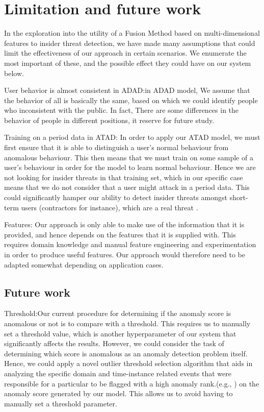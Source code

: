 \documentclass[conference]{IEEEtran}
\begin{document}
\iffalse
\section{Limitation and future work}

In the exploration into the utility of a Fusion Method based on multi-dimensional features to insider threat detection, we have made many assumptions that could limit the effectiveness of our approach in certain scenarios. We enumerate the most important of these, and the possible effect they could have on our system below.

User behavior is almost consistent in ADAD:in ADAD model, We assume that the behavior of all is basically the same, based on which we could identify people who inconsistent with the public. In fact, There are some differences in the behavior of people in different positions, it reserve for future study.

Training on a period data in ATAD: 
In order to apply our ATAD model, we must first ensure that it is able to distinguish a user’s normal behaviour from anomalous behaviour. This then means that we must train on some sample of a user’s behaviour in order for the model to learn normal behaviour. Hence we are not looking for insider threats in that training set, which in our specific case means that we do not consider that a user might attack in a period data. This could significantly hamper our ability to detect insider threats amongst short-term users (contractors for instance), which are a real threat \cite{b48}.

Features: Our approach is only able to make use of the information that it is provided, and hence depends on the features that it is supplied with. This requires domain knowledge and manual feature engineering and experimentation in order to produce useful features. Our approach would therefore need to be adapted somewhat depending on application cases.


\subsection{Future work} 
Threshold:Our current procedure for determining if the anomaly score is anomalous or not is to compare with a threshold. This requires us to manually set a threshold value, which is another hyperparameter of our system that significantly affects the results. However, we could consider the task of determining which score is anomalous as an anomaly detection problem itself. Hence, we could apply a novel outlier threshold selection algorithm that aids in analyzing the specific domain and time-instance related events that were responsible for a particular to be flagged with a high anomaly rank.(e.g., \cite{b49}) on the anomaly score generated by our model. This allows us to avoid having to manually set a threshold parameter.
\end{document}
